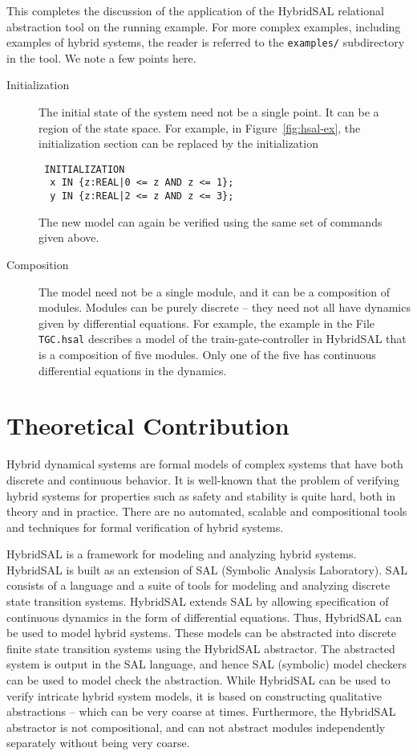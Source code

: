 \documentclass{article}
\begin{document}
This completes the discussion of the application of  the
HybridSAL relational abstraction tool on the running example.
For more complex examples, including examples of hybrid systems,
the reader is referred to the {\tt{examples/}} subdirectory in 
the tool.
We note a few points here.
\begin{description}
\item[Initialization]
The initial state of the system need not be a single point.
It can be a region of the state space.  For example,
in Figure~\ref{fig:hsal-ex}, 
the initialization section can be replaced by
the initialization 
\begin{tt}
 \begin{verbatim}
 INITIALIZATION 
  x IN {z:REAL|0 <= z AND z <= 1};
  y IN {z:REAL|2 <= z AND z <= 3};
 \end{verbatim}
\end{tt}
The new model can again be verified using the same set of commands
given above.
\item[Composition]
The model need not be a single module, and it can be a composition of 
modules.  Modules can be purely discrete -- they need not all have
dynamics given by differential equations.  For example, the example
in the File {\tt{TGC.hsal}} describes a model of the train-gate-controller
in HybridSAL that is a composition of five modules.  Only one of the
five has continuous differential equations in the dynamics.
\end{description}

\section{Theoretical Contribution}

Hybrid dynamical systems are formal models of complex systems 
that have both discrete and continuous behavior.  
It is well-known that the problem of verifying hybrid systems for
properties such as safety and stability is quite
hard, both in theory and in practice.  There are no automated,
scalable and compositional tools and techniques for formal 
verification of hybrid systems.

HybridSAL is a framework for modeling and analyzing hybrid systems.
HybridSAL is built as an extension of SAL (Symbolic Analysis Laboratory).
SAL consists of a language and a suite of tools for modeling and 
analyzing discrete state transition systems.  HybridSAL extends SAL 
by allowing specification of continuous dynamics in the form of 
differential equations.
Thus, HybridSAL can be used to model hybrid systems.
These models can be abstracted into discrete  finite state transition
systems using the HybridSAL abstractor.  The abstracted system
is output in the SAL language, and hence SAL (symbolic) model 
checkers can be used to model check the abstraction.
While HybridSAL can be used to verify intricate hybrid system models,
it is based on constructing qualitative abstractions -- which can
be very coarse at times.  Furthermore, the HybridSAL abstractor is
not compositional, and can not abstract modules independently
separately without being very coarse.
\end{document}
